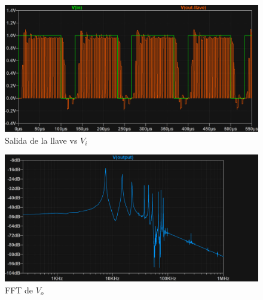 \begin{figure}[H]
    \centering
    \includegraphics[width=0.8\linewidth]{Imagenes Nacho/Instantaneo/out-llave.png}
    \caption{Salida de la llave vs $V_i$}
    \label{fig:out-llave}
\end{figure}


\begin{figure}[H]
    \centering
    \includegraphics[width=0.8\linewidth]{Imagenes Nacho/Instantaneo/Vo-FFT.png}
    \caption{FFT de $V_o$}
    \label{fig:FFT}
\end{figure}

